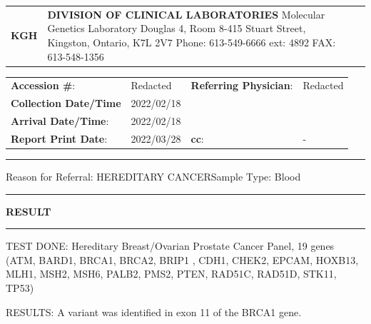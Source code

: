 \documentclass[10pt]{article}
\begin{document}
\begin{tabular}{p{3cm} >{\centering\arraybackslash}p{12.5cm} p{3cm}}
{\Huge \bf KGH} & {\Large \bf DIVISION OF CLINICAL LABORATORIES} \newline
Molecular Genetics Laboratory \newline
Douglas 4, Room 8-415 \newline
76 Stuart Street, Kingston, Ontario, K7L 2V7 \newline
Phone: 613-549-6666 ext: 4892 FAX: 613-548-1356 \newline \\
\end{tabular}


\begin{tabular}{p{4cm} p{5cm} p{4cm} p{5cm}}
{\bf Accession \#}: & Redacted & {\bf Referring Physician}: & Redacted\\
{\bf Collection Date/Time} & 2022/02/18 & & \\
{\bf Arrival Date/Time}: & 2022/02/18 & & \\
{\bf Report Print Date}: & 2022/03/28 & {\bf cc}: & - \\
\end{tabular}

\rule{\textwidth}{0.5mm}

Reason for Referral: HEREDITARY CANCER\hfill Sample Type: Blood

\rule{\textwidth}{0.5mm}
\vspace{-2.8em}
\begin{center}{\large \bf RESULT}\end{center}
\vspace{-2.3em}
\rule{\textwidth}{0.5mm}

TEST DONE: Hereditary Breast/Ovarian Prostate Cancer Panel, 19 genes (ATM, BARD1, BRCA1, BRCA2, BRIP1 , CDH1, CHEK2, EPCAM, HOXB13, MLH1, MSH2, MSH6, PALB2, PMS2, PTEN, RAD51C, RAD51D, STK11, TP53)

RESULTS: A variant was identified in exon 11 of the BRCA1 gene.
\end{document}

